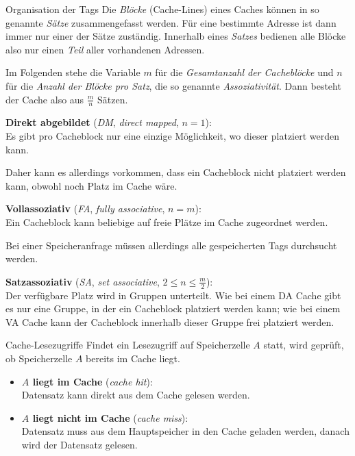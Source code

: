 \documentclass[german]{spicker}
\begin{document}
\begin{defi}{Organisation der Tags}
    Die \emph{Blöcke} (Cache-Lines) eines Caches können in so genannte \emph{Sätze} zusammengefasst werden.
    Für eine bestimmte Adresse ist dann immer nur einer der Sätze zuständig.
    Innerhalb eines \emph{Satzes} bedienen alle Blöcke also nur einen \emph{Teil} aller vorhandenen Adressen.

    Im Folgenden stehe die Variable $m$ für die \emph{Gesamtanzahl der Cacheblöcke} und $n$ für die \emph{Anzahl der Blöcke pro Satz}, die so genannte \emph{Assoziativität}.
    Dann besteht der Cache also aus $\frac {m}{n}$ Sätzen.

    \textbf{Direkt abgebildet} (\emph{DM}, \emph{direct mapped}, $n=1$):\\
    Es gibt pro Cacheblock nur eine einzige Möglichkeit, wo dieser
    platziert werden kann.

    Daher kann es allerdings vorkommen, dass ein Cacheblock
    nicht platziert werden kann, obwohl noch Platz im Cache wäre.

    \textbf{Vollassoziativ} (\emph{FA}, \emph{fully associative}, $n=m$):\\
    Ein Cacheblock kann beliebige auf freie Plätze im Cache zugeordnet
    werden.

    Bei einer Speicheranfrage müssen allerdings alle gespeicherten
    Tags durchsucht werden.

    \textbf{Satzassoziativ} (\emph{SA}, \emph{set associative}, $2\leq n \leq \frac{m}{2}$):\\
    Der verfügbare Platz wird in Gruppen unterteilt. Wie bei einem
    DA Cache gibt es nur eine Gruppe, in der ein Cacheblock platziert werden kann;
    wie bei einem VA Cache kann der Cacheblock innerhalb dieser Gruppe frei platziert
    werden.
\end{defi}

\begin{defi}{Cache-Lesezugriffe}
    Findet ein Lesezugriff auf Speicherzelle $A$ statt, wird geprüft, ob Speicherzelle $A$ bereits im Cache liegt.
    \begin{itemize}
        \item \textbf{$A$ liegt im Cache} (\emph{cache hit}):\\
              Datensatz kann direkt aus dem Cache gelesen werden.
        \item \textbf{$A$ liegt nicht im Cache} (\emph{cache miss}):\\
              Datensatz muss aus dem Hauptspeicher in den Cache geladen werden, danach wird der Datensatz gelesen.
    \end{itemize}
\end{defi}
\end{document}
